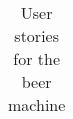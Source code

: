 \begin{table}[H]
\begin{center}
\begin{longtable}{|p{1cm}|p{11cm}|c|c|}
            \caption{User stories for the beer machine}
            \label{tab:user_stories}
        \end{longtable}
    \end{center}
\end{table}